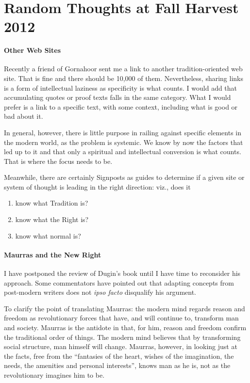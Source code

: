 \section{Random Thoughts at Fall Harvest 2012}

\paragraph{Other Web Sites}

Recently a friend of Gornahoor sent me a link to another tradition-oriented web site. That is fine and there should be 10,000 of them. Nevertheless, sharing links is a form of intellectual laziness as specificity is what counts. I would add that accumulating quotes or proof texts falls in the same category. What I would prefer is a link to a specific text, with some context, including what is good or bad about it.

In general, however, there is little purpose in railing against specific elements in the modern world, as the problem is systemic. We know by now the factors that led up to it and that only a spiritual and intellectual conversion is what counts. That is where the focus needs to be.

Meanwhile, there are certainly Signposts as guides to determine if a given site or system of thought is leading in the right direction: viz., does it

\begin{enumerate}
\item know what Tradition is?
\item know what the Right is?
\item know what normal is?
\end{enumerate}

\paragraph{Maurras and the New Right}

I have postponed the review of Dugin's book until I have time to reconsider his approach. Some commentators have pointed out that adapting concepts from post-modern writers does not \emph{ipso facto} disqualify his argument.

To clarify the point of translating Maurras: the modern mind regards reason and freedom as revolutionary forces that have, and will continue to, transform man and society. Maurras is the antidote in that, for him, reason and freedom confirm the traditional order of things. The modern mind believes that by transforming social structure, man himself will change. Maurras, however, in looking just at the facts, free from the ``fantasies of the heart, wishes of the imagination, the needs, the amenities and personal interests'', knows man as he is, not as the revolutionary imagines him to be.

